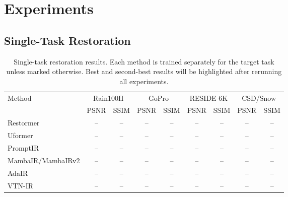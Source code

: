 \documentclass[10pt,twocolumn]{article}
\newcommand{\ours}{VTN-IR}
\begin{document}
\section{Experiments}
\subsection{Single-Task Restoration}
\begin{table}[t]
\centering
\caption{Single-task restoration results. Each method is trained separately for the target task unless marked otherwise. Best and second-best results will be highlighted after rerunning all experiments.}
\label{tab:single_task}
\small
\begin{tabular}{lcccccccc}
\toprule
\multirow{2}{*}{Method} & \multicolumn{2}{c}{Rain100H} & \multicolumn{2}{c}{GoPro} & \multicolumn{2}{c}{RESIDE-6K} & \multicolumn{2}{c}{CSD/Snow} \\
 & PSNR & SSIM & PSNR & SSIM & PSNR & SSIM & PSNR & SSIM \\
\midrule
Restormer & -- & -- & -- & -- & -- & -- & -- & -- \\
Uformer & -- & -- & -- & -- & -- & -- & -- & -- \\
PromptIR & -- & -- & -- & -- & -- & -- & -- & -- \\
MambaIR/MambaIRv2 & -- & -- & -- & -- & -- & -- & -- & -- \\
AdaIR & -- & -- & -- & -- & -- & -- & -- & -- \\
\ours & -- & -- & -- & -- & -- & -- & -- & -- \\
\bottomrule
\end{tabular}
\end{table}
\end{document}
